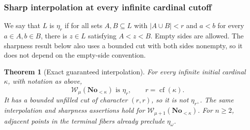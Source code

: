 \documentclass[11pt]{article}
\newtheorem{theorem}{Theorem}[section]
\theoremstyle{definition}
\theoremstyle{remark}
\newcommand{\No}{\mathbf{No}}
\newcommand{\WO}{\mathcal W}
\begin{document}
\subsubsection{Sharp interpolation at every infinite cardinal cutoff}

We say that $L$ is $\eta_r$ if for all sets $A,B\subseteq L$ with
$|A\cup B|<r$ and $a<b$ for every $a\in A,b\in B$, there is
$z\in L$ satisfying $A<z<B$.  Empty sides are allowed.  The sharpness
result below also uses a bounded cut with both sides nonempty, so it
does not depend on the empty-side convention.

\begin{theorem}[Exact guaranteed interpolation]
\label{swo:sh:thm:new-cutoff-interpolation}
For every infinite initial cardinal $\kappa$, with notation as above,
\[
 \WO_\mu(\No_{<\kappa})\text{ is }\eta_r,
 \qquad r=\operatorname{cf}(\kappa).
\]
It has a bounded unfilled cut of character $(r,r)$, so it is not
$\eta_{r^+}$.  The same interpolation and sharpness assertions hold
for $\WO_{\mu+1}(\No_{<\kappa})$.  For $n\geq2$, adjacent points in
the terminal fibers already preclude $\eta_\omega$.
\end{theorem}
\end{document}

